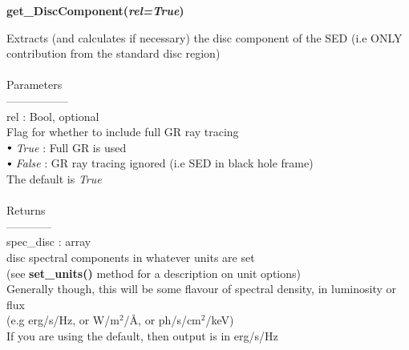 \documentclass[a4paper, 11pt, times, onecolumn]{article}
\newcommand{\sbt}{\,\begin{picture}(-1,1)(-1,-3)\circle*{3}\end{picture}\ }
\begin{document}
\vspace{1cm}

\noindent
{\bf get\_DiscComponent(\textit{rel=True})}
\begin{adjustwidth}{1.5cm}{}

	\noindent
	Extracts (and calculates if necessary) the disc component of the SED (i.e ONLY contribution from the standard disc region)
	\\~\\
	Parameters\\
	-----------------\\
	\indent rel : Bool, optional \\
	\indent \indent Flag for whether to include full GR ray tracing \\
	\indent \indent \indent $\sbt$ {\it True} : Full GR is used \\
	\indent \indent \indent $\sbt$ {\it False} : GR ray tracing ignored (i.e SED in black hole frame) \\
	\indent \indent The default is {\it True}
	\\~\\
	Returns \\
	------------\\ 
	\indent spec\_disc : array \\
	\indent \indent disc spectral components in whatever units are set \\
	\indent \indent (see {\bf set\_units()} method for a description on unit options) \\
	\indent \indent Generally though, this will be some flavour of spectral density, in luminosity or flux \\
	\indent \indent  (e.g erg/s/Hz, or W/m$^{2}$/\AA,  or ph/s/cm$^{2}$/keV) \\
	\indent \indent If you are using the default, then output is in erg/s/Hz

\end{adjustwidth}

\vspace{1cm}
\end{document}
